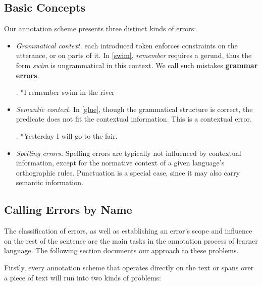 \documentclass[12pt]{article}
\begin{document}
\subsection{Basic Concepts}\label{sec:threeholies}

Our annotation scheme presents three distinct kinds of errors:

\begin{itemize}
  \item \textit{Grammatical context.} each introduced token enforces constraints
  on the utterance, or on parts of it. In \ref{swim}, \textit{remember} requires
  a gerund, thus the form \textit{swim} is ungrammatical in this context. We
  call such mistakes \textbf{grammar errors}.

  \ex. *I remember swim in the river\label{swim}

  \item \textit{Semantic context.}  In \ref{glue}, though the grammatical
  structure is correct, the predicate does not fit the contextual information.
  This is a contextual error.

  \ex. *Yesterday I will go to the fair.\label{glue}

  \item \textit{Spelling errors.} Spelling errors are typically not influenced
  by contextual information, except for the normative context of a given
  language's orthographic rules. Punctuation is a special case, since it may
  also carry semantic information.

  \end{itemize}

\subsection{Calling Errors by Name}\label{sec:taxonomy}

The classification of errors, as well as establishing an error's scope and 
influence on the rest of the sentence are the main tasks in the annotation
process of learner language. The following section documents our approach to
these problems.

Firstly, every annotation scheme that operates directly on the text or spans
over a piece of text will run into two kinds of problems:
\end{document}

